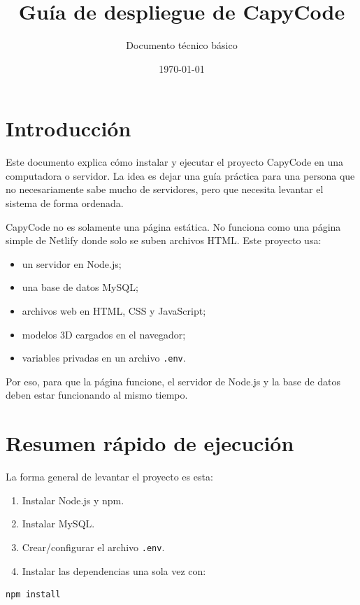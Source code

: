 \documentclass[12pt,letterpaper]{article}
\title{Guía de despliegue de CapyCode}
\author{Documento técnico básico}
\date{\today}
\begin{document}
\maketitle

\section{Introducción}

Este documento explica cómo instalar y ejecutar el proyecto CapyCode en una computadora o servidor. La idea es dejar una guía práctica para una persona que no necesariamente sabe mucho de servidores, pero que necesita levantar el sistema de forma ordenada.

CapyCode no es solamente una página estática. No funciona como una página simple de Netlify donde solo se suben archivos HTML. Este proyecto usa:

\begin{itemize}
  \item un servidor en Node.js;
  \item una base de datos MySQL;
  \item archivos web en HTML, CSS y JavaScript;
  \item modelos 3D cargados en el navegador;
  \item variables privadas en un archivo \texttt{.env}.
\end{itemize}

Por eso, para que la página funcione, el servidor de Node.js y la base de datos deben estar funcionando al mismo tiempo.

\section{Resumen rápido de ejecución}

La forma general de levantar el proyecto es esta:

\begin{enumerate}
  \item Instalar Node.js y npm.
  \item Instalar MySQL.
  \item Crear/configurar el archivo \texttt{.env}.
  \item Instalar las dependencias una sola vez con:
\end{enumerate}

\begin{lstlisting}[style=comandos]
npm install
\end{lstlisting}
\end{document}
